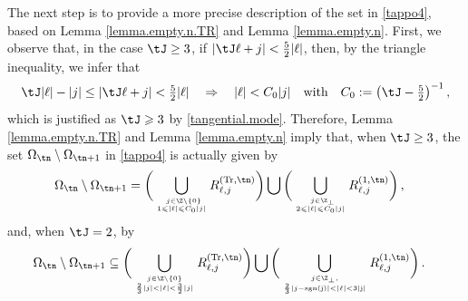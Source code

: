 \documentclass[a4paper,reqno,10pt]{article}
\begin{document}
The next step is to provide a more precise description of the set in \eqref{tappo4}, based on Lemma \ref{lemma.empty.n.TR} and Lemma \ref{lemma.empty.n}.
First, we observe that, in the case $\tJ\geq 3$, if $|\tJ \ell + j| < \tfrac52 |\ell|$, then, by the triangle inequality, we infer that
\begin{equation}
	\tJ |\ell| -|j|  \leq |\tJ \ell + j | < \tfrac52 |\ell| \quad \Rightarrow \quad |\ell| < C_0 |j|\quad\hbox{with}\quad C_0:=\big( \tJ -\tfrac52 \big)^{-1}\,,
\end{equation}
which is justified as  $\tJ\geqslant 3$ by \eqref{tangential.mode}. Therefore,  Lemma \ref{lemma.empty.n.TR} and Lemma \ref{lemma.empty.n} imply that, when $\tJ\geq 3$, the set $\Omega_{\tn}\setminus\Omega_{\tn+1}$ in \eqref{tappo4} is actually given by
\begin{align}\label{compl.set.less}
	\Omega_{\tn}\setminus\Omega_{\tn+1}& =  \bigg(\bigcup_{ \ j\in \Z\backslash\{0\} \atop 1 \leqslant  |\ell| \leqslant C_0 |j| } R_{\ell,j}^{({\rm Tr},\tn)}\bigg)  \bigcup \bigg(\bigcup_{ \ j\in \Z_\perp   \atop 2\leqslant  |\ell| \leqslant C_0 |j| } R_{\ell,j}^{(1,\tn)}\bigg) \,,
\end{align}
and, when $\tJ= 2$, by
\begin{align}\label{compl.set.less.2}
	\Omega_{\tn}\setminus\Omega_{\tn+1}& \subseteq \bigg(\bigcup_{ j \in \Z\setminus\{0\} \atop \frac23|j| < |\ell| < \frac32 |j| } R_{\ell,j}^{({\rm Tr},\tn)}\bigg)  \bigcup \bigg(\bigcup_{  j\in \Z_\perp,  \atop \frac23|j-\rm{sgn}(j)|<  |\ell| < 3 |j| } R_{\ell,j}^{(1,\tn)}\bigg) \,.
\end{align}
\end{document}
